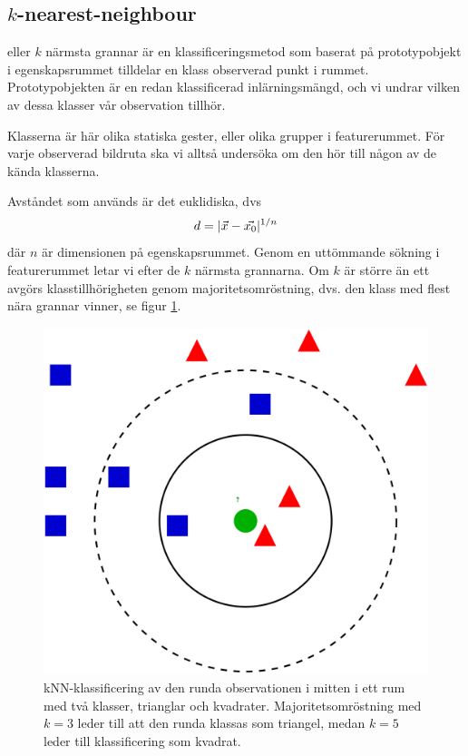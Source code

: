 \documentclass[../rapport_MVEX01-11-05]{subfiles}
\begin{document}
\subsection{$k$-nearest-neighbour}\label{sec:knn}

\knn eller $k$ närmsta grannar är en klassificeringsmetod som baserat på
prototypobjekt i egenskapsrummet tilldelar en klass observerad punkt i rummet.
Prototypobjekten är en redan klassificerad inlärningsmängd, och vi undrar vilken
av dessa klasser vår observation tillhör.

Klasserna är här olika statiska gester, eller olika grupper i featurerummet. För varje observerad bildruta ska vi alltså undersöka om den hör till någon av de kända klasserna.

Avståndet som används är det euklidiska, dvs
\begin{equation*}
    d = |\vec{x}-\vec{x_0}|^{1/n}
\end{equation*}
där $n$ är dimensionen på egenskapsrummet. Genom en uttömmande sökning i featurerummet letar vi efter de $k$ närmsta grannarna. Om $k$ är större än ett avgörs klasstillhörigheten genom majoritetsomröstning, dvs. den klass med flest nära grannar vinner, se figur \ref{fig:knn-overview}.

\begin{figure}[!htb]
    \begin{center}
\includegraphics[width=0.75\columnwidth]{bilder/2000px-KnnClassification.png}
    \end{center}
    \caption{kNN-klassificering av den runda observationen i mitten i ett rum
    med två klasser, trianglar och kvadrater. Majoritetsomröstning
    med $k=3$ leder till att den runda klassas som triangel, medan $k=5$ leder
    till klassificering som kvadrat.}
    \label{fig:knn-overview}
\end{figure}
\end{document}
